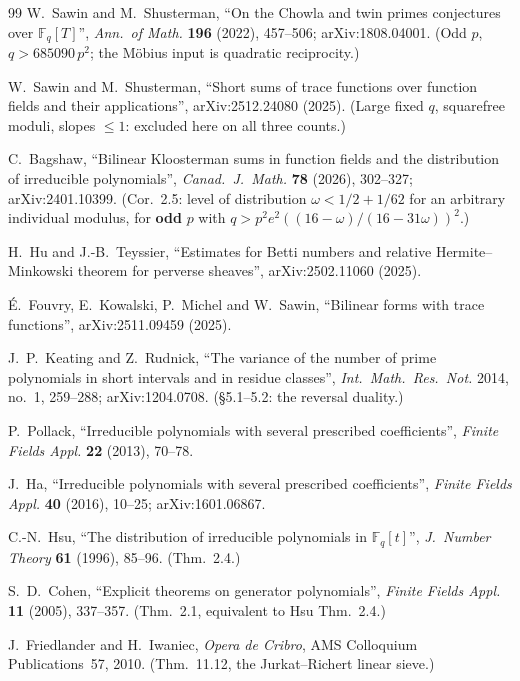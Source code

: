 \documentclass[10pt]{article}
\theoremstyle{plain}
\theoremstyle{definition}
\newcommand{\F}{\mathbb F}
\begin{document}
\begin{thebibliography}{99}
W.~Sawin and M.~Shusterman, ``On the Chowla and twin primes conjectures over
$\F_q[T]$'', \emph{Ann.\ of Math.} \textbf{196} (2022), 457--506;
arXiv:1808.04001. (Odd $p$, $q>685090\,p^2$; the M\"obius input is quadratic
reciprocity.)

W.~Sawin and M.~Shusterman, ``Short sums of trace functions over function
fields and their applications'', arXiv:2512.24080 (2025). (Large fixed $q$,
squarefree moduli, slopes $\le1$: excluded here on all three counts.)

C.~Bagshaw, ``Bilinear Kloosterman sums in function fields and the distribution
of irreducible polynomials'', \emph{Canad.\ J.\ Math.} \textbf{78} (2026),
302--327; arXiv:2401.10399. (Cor.~2.5: level of distribution $\omega<1/2+1/62$
for an arbitrary individual modulus, for \textbf{odd} $p$ with
$q>p^2e^2((16-\omega)/(16-31\omega))^2$.)

H.~Hu and J.-B.~Teyssier, ``Estimates for Betti numbers and relative
Hermite--Minkowski theorem for perverse sheaves'', arXiv:2502.11060 (2025).

\'E.~Fouvry, E.~Kowalski, P.~Michel and W.~Sawin, ``Bilinear forms with trace
functions'', arXiv:2511.09459 (2025).

J.~P.~Keating and Z.~Rudnick, ``The variance of the number of prime polynomials
in short intervals and in residue classes'', \emph{Int.\ Math.\ Res.\ Not.}
2014, no.~1, 259--288; arXiv:1204.0708. (\S5.1--5.2: the reversal duality.)

P.~Pollack, ``Irreducible polynomials with several prescribed coefficients'',
\emph{Finite Fields Appl.} \textbf{22} (2013), 70--78.

J.~Ha, ``Irreducible polynomials with several prescribed coefficients'',
\emph{Finite Fields Appl.} \textbf{40} (2016), 10--25; arXiv:1601.06867.

C.-N.~Hsu, ``The distribution of irreducible polynomials in $\F_q[t]$'',
\emph{J.\ Number Theory} \textbf{61} (1996), 85--96. (Thm.~2.4.)

S.~D.~Cohen, ``Explicit theorems on generator polynomials'', \emph{Finite
Fields Appl.} \textbf{11} (2005), 337--357. (Thm.~2.1, equivalent to
Hsu Thm.~2.4.)

J.~Friedlander and H.~Iwaniec, \emph{Opera de Cribro}, AMS Colloquium
Publications~57, 2010. (Thm.~11.12, the Jurkat--Richert linear sieve.)


\end{thebibliography}
\end{document}
